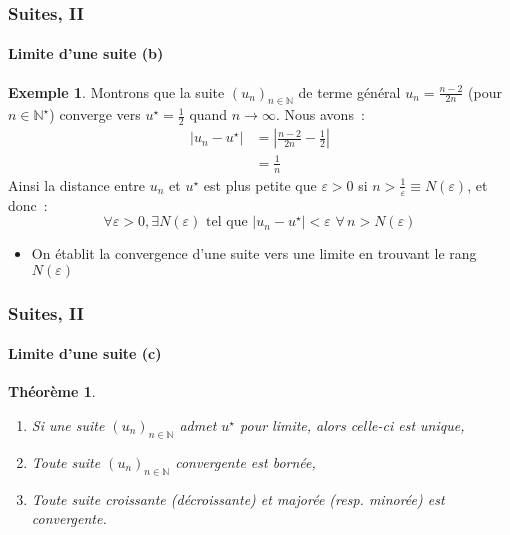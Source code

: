 \documentclass[10pt,notheorems]{beamer}
\theoremstyle{plain}
\newtheorem{theorem}{Théorème}
\theoremstyle{definition} %
\newtheorem{example}{Exemple}
\begin{document}
\begin{frame}
  \frametitle{Suites, II}
  \framesubtitle{Limite d'une suite (b)}
  \hypertarget{slide_suite_limite_2}{}

  \bigskip

  \begin{example}
    Montrons que la suite $(u_n)_{n\in\mathbb N}$ de terme général $u_n = \frac{n-2}{2n}$ (pour $n\in\mathbb N^{\star}$) converge vers $u^{\star} = \frac{1}{2}$ quand $n\rightarrow\infty$. Nous avons~:
    \[
      \begin{split}
        |u_n-u^{\star}| &= \left|\frac{n-2}{2n}-\frac{1}{2}\right|\\
        &= \frac{1}{n}
      \end{split}
    \]
    Ainsi la distance entre $u_n$ et $u^{\star}$ est plus petite que $\varepsilon>0$ si $n>\frac{1}{\varepsilon}\equiv N(\varepsilon)$, et donc~:
    \[
      \forall \varepsilon>0, \exists N(\varepsilon) \text{ tel que } |u_n-u^{\star}|<\varepsilon\,\, \forall \, n>N(\varepsilon)
    \]
  \end{example}

  \bigskip

  \begin{itemize}

  \item On établit la convergence d'une suite vers une limite en trouvant le rang $N(\varepsilon)$

  \end{itemize}

\end{frame}


\begin{frame}
  \frametitle{Suites, II}
  \framesubtitle{Limite d'une suite (c)}
  \hypertarget{slide_suite_limite_3}{}

  \bigskip

  \begin{theorem}
    \medskip
    \begin{enumerate}

    \item Si une suite $(u_n)_{n\in\mathbb N}$ admet $u^{\star}$ pour limite, alors celle-ci est unique,\newline

    \item Toute suite $(u_n)_{n\in\mathbb N}$ convergente est bornée,\newline

    \item Toute suite croissante (décroissante) et majorée (resp. minorée) est convergente.\newline

    \end{enumerate}
  \end{theorem}

\end{frame}
\end{document}
